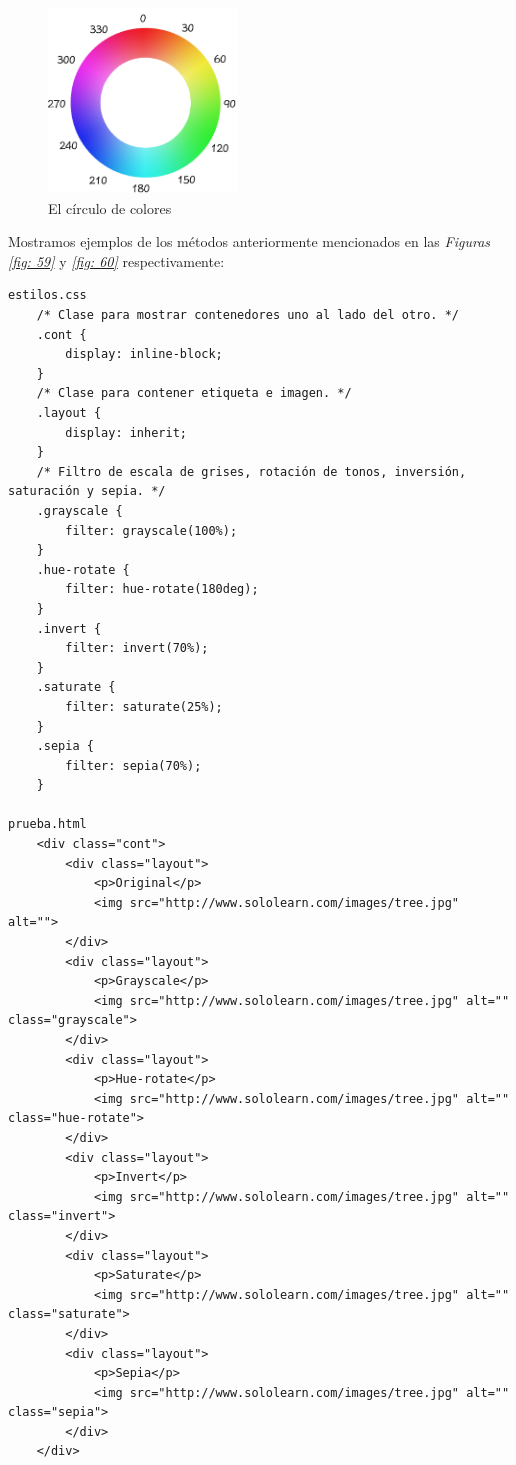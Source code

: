 \begin{figure}[H]
    \centering
    \caption{El círculo de colores}
    \label{fig: 58}
    \includegraphics[width=5cm]{ss/circle-of-colors.png}
\end{figure}

Mostramos ejemplos de los métodos anteriormente mencionados en las \textit{Figuras \ref{fig: 59}} y \textit{\ref{fig: 60}} respectivamente:
\begin{lstlisting}
estilos.css
    /* Clase para mostrar contenedores uno al lado del otro. */
    .cont {
        display: inline-block;
    }
    /* Clase para contener etiqueta e imagen. */
    .layout {
        display: inherit;
    }
    /* Filtro de escala de grises, rotación de tonos, inversión, saturación y sepia. */
    .grayscale {
        filter: grayscale(100%);
    }
    .hue-rotate {
        filter: hue-rotate(180deg);
    }
    .invert {
        filter: invert(70%);
    }
    .saturate {
        filter: saturate(25%);
    }
    .sepia {
        filter: sepia(70%);
    }

prueba.html
    <div class="cont">
        <div class="layout">
            <p>Original</p>
            <img src="http://www.sololearn.com/images/tree.jpg" alt="">
        </div>
        <div class="layout">
            <p>Grayscale</p>
            <img src="http://www.sololearn.com/images/tree.jpg" alt="" class="grayscale">
        </div>
        <div class="layout">
            <p>Hue-rotate</p>
            <img src="http://www.sololearn.com/images/tree.jpg" alt="" class="hue-rotate">
        </div>
        <div class="layout">
            <p>Invert</p>
            <img src="http://www.sololearn.com/images/tree.jpg" alt="" class="invert">
        </div>
        <div class="layout">
            <p>Saturate</p>
            <img src="http://www.sololearn.com/images/tree.jpg" alt="" class="saturate">
        </div>
        <div class="layout">
            <p>Sepia</p>
            <img src="http://www.sololearn.com/images/tree.jpg" alt="" class="sepia">
        </div>
    </div>
\end{lstlisting}
